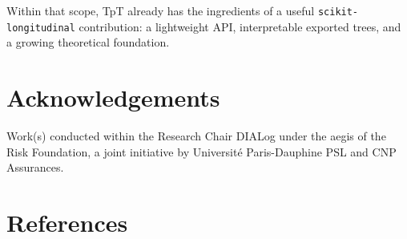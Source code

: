 \documentclass[
]{article}
\begin{document}
Within that scope, TpT already has the ingredients of a useful
\texttt{scikit-longitudinal} contribution: a lightweight API,
interpretable exported trees, and a growing theoretical foundation.

\section{Acknowledgements}\label{acknowledgements}

Work(s) conducted within the Research Chair DIALog under the aegis of
the Risk Foundation, a joint initiative by Université Paris-Dauphine PSL
and CNP Assurances.

\section*{References}\label{references}
\end{document}
